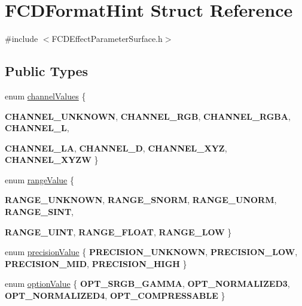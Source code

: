 \hypertarget{structFCDFormatHint}{
\section{FCDFormatHint Struct Reference}
\label{structFCDFormatHint}
}


{\ttfamily \#include $<$FCDEffectParameterSurface.h$>$}

\subsection*{Public Types}
\begin{DoxyCompactItemize}
\item 
enum \hyperlink{structFCDFormatHint_a4c22503ef75be12aa19a582b88ce32c1}{channelValues} \{ \par
{\bfseries CHANNEL\_\-UNKNOWN}, 
{\bfseries CHANNEL\_\-RGB}, 
{\bfseries CHANNEL\_\-RGBA}, 
{\bfseries CHANNEL\_\-L}, 
\par
{\bfseries CHANNEL\_\-LA}, 
{\bfseries CHANNEL\_\-D}, 
{\bfseries CHANNEL\_\-XYZ}, 
{\bfseries CHANNEL\_\-XYZW}
 \}
\item 
enum \hyperlink{structFCDFormatHint_a28f1ee9691301b71d657b472689d77a9}{rangeValue} \{ \par
{\bfseries RANGE\_\-UNKNOWN}, 
{\bfseries RANGE\_\-SNORM}, 
{\bfseries RANGE\_\-UNORM}, 
{\bfseries RANGE\_\-SINT}, 
\par
{\bfseries RANGE\_\-UINT}, 
{\bfseries RANGE\_\-FLOAT}, 
{\bfseries RANGE\_\-LOW}
 \}
\item 
enum \hyperlink{structFCDFormatHint_a720a2fffc66e38ba997c263e22ddc2c2}{precisionValue} \{ {\bfseries PRECISION\_\-UNKNOWN}, 
{\bfseries PRECISION\_\-LOW}, 
{\bfseries PRECISION\_\-MID}, 
{\bfseries PRECISION\_\-HIGH}
 \}
\item 
enum \hyperlink{structFCDFormatHint_a4777b8826090e9f6c9812711faf3ac66}{optionValue} \{ {\bfseries OPT\_\-SRGB\_\-GAMMA}, 
{\bfseries OPT\_\-NORMALIZED3}, 
{\bfseries OPT\_\-NORMALIZED4}, 
{\bfseries OPT\_\-COMPRESSABLE}
 \}
\end{DoxyCompactItemize}
